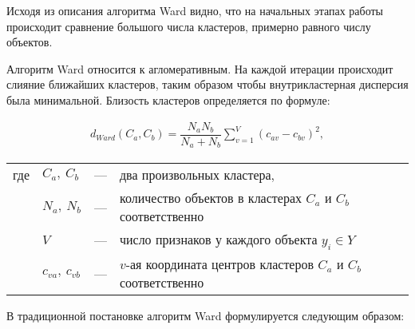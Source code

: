 \documentclass[12pt]{a&t}
\begin{document}
\newpage
Исходя из описания алгоритма Ward видно, что на начальных этапах работы происходит сравнение большого числа кластеров, примерно равного числу объектов. 


Алгоритм Ward относится к агломеративным. На каждой итерации происходит слияние ближайших кластеров, таким образом чтобы внутрикластерная дисперсия была минимальной. Близость кластеров определяется по формуле:

\begin{gather} \label{eq:ward-distance}
	d_{Ward}(C_a,C_b)=\dfrac{N_aN_b}{N_a+N_b}\sum_{v=1}^{V}(c_{av}-c_{bv})^2,
\end{gather}

\begin{tabular}{llll}
	где & $ C_a,\:C_b $ & {---} & два произвольных кластера, \\
	& $ N_a,\:N_b $ & {---} & количество объектов в кластерах $ C_a $ и $ C_b $ соответственно \\
	& $ V $ & {---} & число признаков у каждого объекта $ y_i \in Y $ \\
	& $ c_{va},\:c_{vb} $ & {---} & $ v $-ая координата центров кластеров $ C_a $ и $ C_b $ соответственно 
\end{tabular}

В традиционной постановке алгоритм Ward формулируется следующим образом:




\newpage
\end{document}

